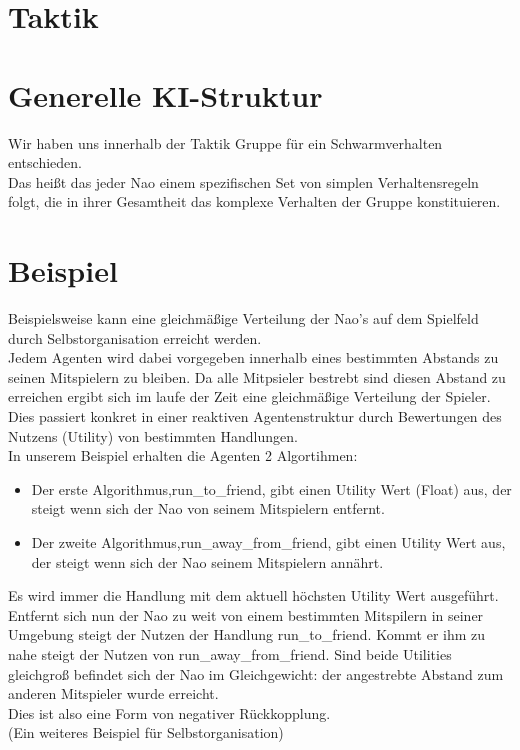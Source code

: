 \section*{Taktik}
\section*{Generelle KI-Struktur}
Wir haben uns innerhalb der Taktik Gruppe für ein Schwarmverhalten entschieden.\\
Das heißt das jeder Nao einem spezifischen Set von simplen 
Verhaltensregeln folgt, die in ihrer Gesamtheit das komplexe Verhalten 
der Gruppe konstituieren.

\section*{Beispiel}
Beispielsweise kann eine gleichmäßige Verteilung der Nao's auf dem Spielfeld durch Selbstorganisation
erreicht werden.\\
Jedem Agenten wird dabei vorgegeben innerhalb eines bestimmten 
Abstands zu seinen Mitspielern zu bleiben. Da alle Mitpsieler bestrebt 
sind diesen Abstand zu erreichen ergibt sich im laufe der Zeit eine 
gleichmäßige Verteilung der Spieler.\\
Dies passiert konkret in einer reaktiven Agentenstruktur durch Bewertungen des Nutzens (Utility) von bestimmten Handlungen.\\
In unserem Beispiel erhalten die Agenten 2 Algortihmen:

\begin{itemize}
\item Der erste Algorithmus,run\_to\_friend, gibt einen Utility Wert 
(Float) aus, der steigt wenn sich der Nao von seinem Mitspielern 
entfernt.
\item Der zweite Algorithmus,run\_away\_from\_friend, gibt einen Utility
 Wert aus, der steigt wenn sich der Nao seinem Mitspielern annährt.
\end{itemize}
Es wird immer die Handlung mit dem aktuell höchsten Utility Wert ausgeführt.\\
Entfernt sich nun der Nao zu weit von einem bestimmten Mitspilern
 in seiner Umgebung steigt der Nutzen der Handlung run\_to\_friend. 
Kommt er ihm zu nahe steigt der Nutzen von run\_away\_from\_friend.
Sind beide Utilities gleichgroß befindet sich der Nao im Gleichgewicht: 
der angestrebte Abstand zum anderen Mitspieler wurde erreicht.\\
Dies ist also eine Form von negativer Rückkopplung.\\
(Ein weiteres Beispiel für Selbstorganisation)

